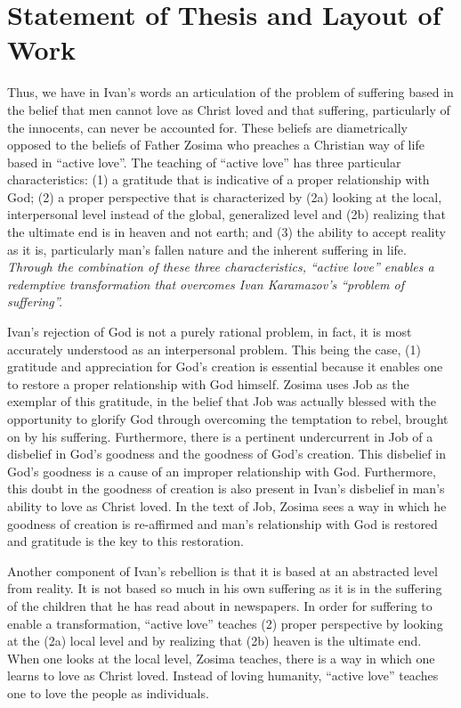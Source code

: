\section{Statement of Thesis and Layout of Work}

Thus, we have in Ivan's words an articulation of the problem of suffering based in the belief that men cannot love as Christ loved and that suffering, particularly of the innocents, can never be accounted for. These beliefs are diametrically opposed to the beliefs of Father Zosima who preaches a Christian way of life based in ``active love''. The teaching of ``active love'' has three particular characteristics: (1) a gratitude that is indicative of a proper relationship with God; (2) a proper perspective that is characterized by (2a) looking at the local, interpersonal level instead of the global, generalized level and (2b) realizing that the ultimate end is in heaven and not earth; and (3) the ability to accept reality as it is, particularly man's fallen nature and the inherent suffering in life. \emph{Through the combination of these three characteristics, ``active love'' enables a redemptive transformation that overcomes Ivan Karamazov's ``problem of suffering''.}

Ivan's rejection of God is not a purely rational problem, in fact, it is most accurately understood as an interpersonal problem. This being the case, (1) gratitude and appreciation for God's creation is essential because it enables one to restore a proper relationship with God himself. Zosima uses Job as the exemplar of this gratitude, in the belief that Job was actually blessed with the opportunity to glorify God through overcoming the temptation to rebel, brought on by his suffering. Furthermore, there is a pertinent undercurrent in Job of a disbelief in God's goodness and the goodness of God's creation. This disbelief in God's goodness is a cause of an improper relationship with God. Furthermore, this doubt in the goodness of creation is also present in Ivan's disbelief in man's ability to love as Christ loved. In the text of Job, Zosima sees a way in which he goodness of creation is re-affirmed and man's relationship with God is restored and gratitude is the key to this restoration.

Another component of Ivan's rebellion is that it is based at an abstracted level from reality. It is not based so much in his own suffering as it is in the suffering of the children that he has read about in newspapers. In order for suffering to enable a transformation, ``active love'' teaches (2) proper perspective by looking at the (2a) local level and by realizing that (2b) heaven is the ultimate end. When one looks at the local level, Zosima teaches, there is a way in which one learns to love as Christ loved. Instead of loving humanity, ``active love'' teaches one to love the people as individuals.

